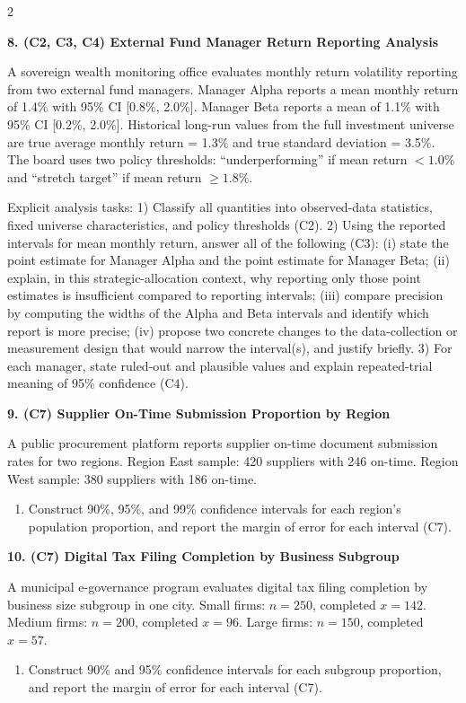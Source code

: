 \documentclass[12pt]{article}
\newcommand{\SubsectionBox}[1]{%
	\noindent\colorbox{gray!30}{%
		\parbox{\linewidth}{\textbf{#1}}%
	}\par\vspace{0.35cm}%
}
\begin{document}
\begin{multicols}{2}
		\vspace{0.25cm}
		\SubsectionBox{8. (C2, C3, C4) External Fund Manager Return Reporting Analysis}\vspace{-0.25cm}
		A sovereign wealth monitoring office evaluates monthly return volatility reporting from two external fund managers.
		Manager Alpha reports a mean monthly return of 1.4\% with 95\% CI [0.8\%, 2.0\%].
		Manager Beta reports a mean of 1.1\% with 95\% CI [0.2\%, 2.0\%].
		Historical long-run values from the full investment universe are true average monthly return = 1.3\% and true standard deviation = 3.5\%.
		The board uses two policy thresholds: ``underperforming'' if mean return $<1.0\%$ and ``stretch target'' if mean return $\ge 1.8\%$.
		
		Explicit analysis tasks:
		1) Classify all quantities into observed-data statistics, fixed universe characteristics, and policy thresholds (C2).
		2) Using the reported intervals for mean monthly return, answer all of the following (C3): (i) state the point estimate for Manager Alpha and the point estimate for Manager Beta; (ii) explain, in this strategic-allocation context, why reporting only those point estimates is insufficient compared to reporting intervals; (iii) compare precision by computing the widths of the Alpha and Beta intervals and identify which report is more precise; (iv) propose two concrete changes to the data-collection or measurement design that would narrow the interval(s), and justify briefly.
		3) For each manager, state ruled-out and plausible values and explain repeated-trial meaning of 95\% confidence (C4).
		
		\vspace{0.25cm}
		\SubsectionBox{9. (C7) Supplier On-Time Submission Proportion by Region}\vspace{-0.25cm}
		A public procurement platform reports supplier on-time document submission rates for two regions.
		Region East sample: 420 suppliers with 246 on-time.
		Region West sample: 380 suppliers with 186 on-time.
		\begin{enumerate}
			\item Construct 90\%, 95\%, and 99\% confidence intervals for each region's population proportion, and report the margin of error for each interval (C7).
		\end{enumerate}
		
		\vspace{0.25cm}
		\SubsectionBox{10. (C7) Digital Tax Filing Completion by Business Subgroup}\vspace{-0.25cm}
		A municipal e-governance program evaluates digital tax filing completion by business size subgroup in one city.
		Small firms: $n=250$, completed $x=142$.
		Medium firms: $n=200$, completed $x=96$.
		Large firms: $n=150$, completed $x=57$.
		\begin{enumerate}
			\item Construct 90\% and 95\% confidence intervals for each subgroup proportion, and report the margin of error for each interval (C7).
		\end{enumerate}
		

\end{multicols}
\end{document}
